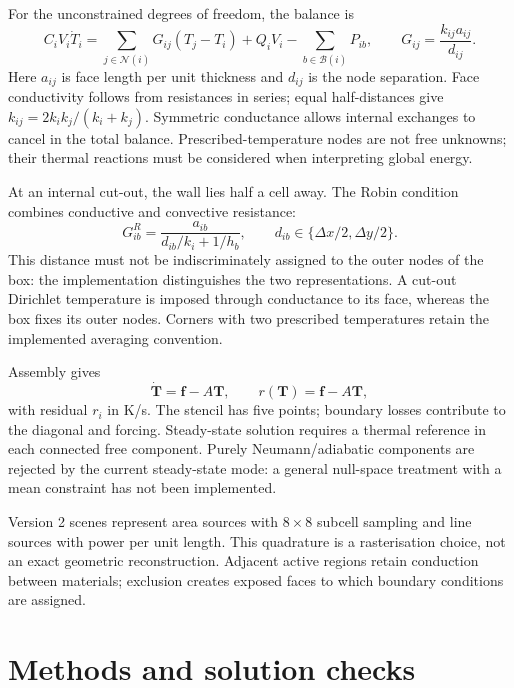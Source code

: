 \documentclass[11pt,a4paper]{article}
\begin{document}
For the unconstrained degrees of freedom, the balance is
\begin{equation}
 C_iV_i\dot T_i=\sum_{j\in\mathcal N(i)}G_{ij}(T_j-T_i)+Q_iV_i-\sum_{b\in\mathcal B(i)}P_{ib},\qquad G_{ij}=\frac{k_{ij}a_{ij}}{d_{ij}}.
 \label{eq:balance}
\end{equation}
Here $a_{ij}$ is face length per unit thickness and $d_{ij}$ is the node separation. Face conductivity follows from resistances in series; equal half-distances give $k_{ij}=2k_ik_j/(k_i+k_j)$. Symmetric conductance allows internal exchanges to cancel in the total balance. Prescribed-temperature nodes are not free unknowns; their thermal reactions must be considered when interpreting global energy.

At an internal cut-out, the wall lies half a cell away. The Robin condition combines conductive and convective resistance:
\begin{equation}
 G_{ib}^{R}=\frac{a_{ib}}{d_{ib}/k_i+1/h_b},\qquad d_{ib}\in\{\Delta x/2,\Delta y/2\}.
 \label{eq:robin}
\end{equation}
This distance must not be indiscriminately assigned to the outer nodes of the box: the implementation distinguishes the two representations. A cut-out Dirichlet temperature is imposed through conductance to its face, whereas the box fixes its outer nodes. Corners with two prescribed temperatures retain the implemented averaging convention.

Assembly gives
\begin{equation}
 \dot{\mathbf T}=\mathbf f-A\mathbf T,\qquad r(\mathbf T)=\mathbf f-A\mathbf T,
 \label{eq:ode}
\end{equation}
with residual $r_i$ in K/s. The stencil has five points; boundary losses contribute to the diagonal and forcing. Steady-state solution requires a thermal reference in each connected free component. Purely Neumann/adiabatic components are rejected by the current steady-state mode: a general null-space treatment with a mean constraint has not been implemented.

Version 2 scenes represent area sources with $8\times8$ subcell sampling and line sources with power per unit length. This quadrature is a rasterisation choice, not an exact geometric reconstruction. Adjacent active regions retain conduction between materials; exclusion creates exposed faces to which boundary conditions are assigned.

\section{Methods and solution checks}
\end{document}

